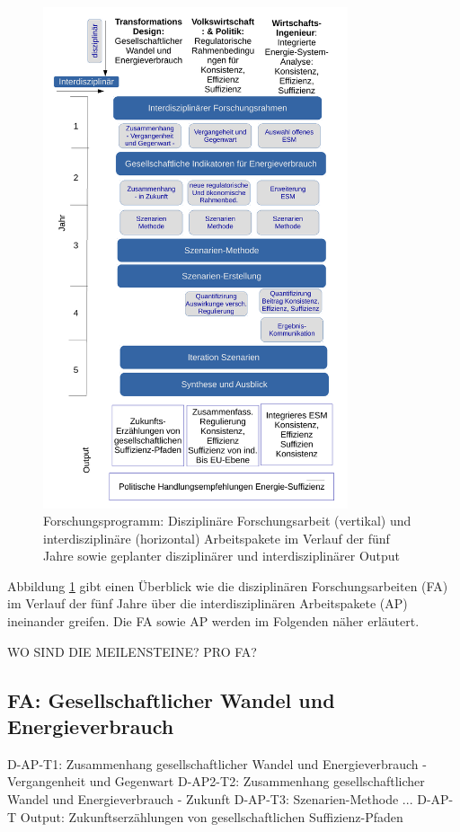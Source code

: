 \documentclass[a4paper,11pt,twoside]{scrartcl}
\begin{document}

\begin{figure}[!h]
    \centering
    \includegraphics[width=0.8\textwidth]{figures/Forschungsarbeit.pdf}
    \caption{Forschungsprogramm: Disziplinäre Forschungsarbeit (vertikal) und  interdisziplinäre (horizontal) Arbeitspakete im Verlauf der fünf Jahre sowie geplanter disziplinärer und interdisziplinärer Output}
    \label{fig:forschungsprogramm}
\end{figure}

Abbildung \ref{fig:forschungsprogramm} gibt einen Überblick wie die disziplinären Forschungsarbeiten (FA) im Verlauf der fünf Jahre über die interdisziplinären Arbeitspakete (AP) ineinander greifen. Die FA sowie AP werden im Folgenden näher erläutert.

WO SIND DIE MEILENSTEINE? PRO FA?

\subsection*{FA: Gesellschaftlicher Wandel und Energieverbrauch}
D-AP-T1: Zusammenhang gesellschaftlicher Wandel und Energieverbrauch - Vergangenheit und Gegenwart
D-AP2-T2: Zusammenhang gesellschaftlicher Wandel und Energieverbrauch - Zukunft
D-AP-T3: Szenarien-Methode
...
D-AP-T Output: Zukunftserzählungen von gesellschaftlichen Suffizienz-Pfaden
\end{document}
